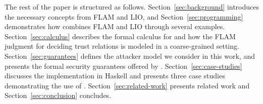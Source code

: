 The rest of the paper is structured as follows. Section~\ref{sec:background} introduces the necessary concepts from FLAM and LIO, and Section~\ref{sec:programming} demonstrates how \lang{} combines FLAM and LIO through several examples. Section~\ref{sec:calculus} describes the formal calculus for \lang{} and how the FLAM judgment for deciding trust relations is modeled in a coarse-grained setting. Section~\ref{sec:guarantees} defines the attacker model we consider in this work, and presents the formal security guarantees offered by \lang. Section~\ref{sec:case-studies} discusses the implementation in Haskell and presents three case studies demonstrating the use of \lang. Section~\ref{sec:related-work} presents related work and Section~\ref{sec:conclusion} concludes.